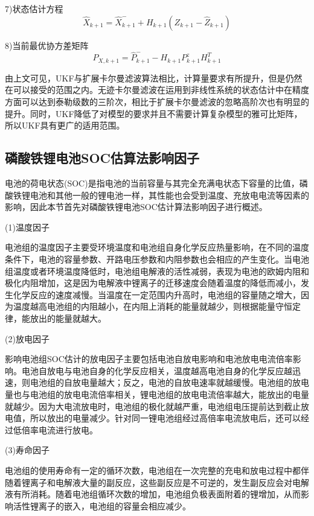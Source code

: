 7)状态估计方程
\begin{equation}
{\widehat X_{k + 1}} = \widehat X_{k + 1}^ -  + {H_{k + 1}}({Z_{k + 1}} - {\widehat Z_{k + 1}})
\end{equation} 

8)当前最优协方差矩阵
\begin{equation}
{P_{X,k + 1}} = \widehat P_{k + 1}^ -  - {H_{k + 1}}P_{k + 1}^zH_{k + 1}^T
\end{equation} 

由上文可见，UKF与扩展卡尔曼滤波算法相比，计算量要求有所提升，但是仍然在可以接受的范围之内。无迹卡尔曼滤波在运用到非线性系统的状态估计中在精度方面可以达到泰勒级数的三阶次，相比于扩展卡尔曼滤波的忽略高阶次也有明显的提升。同时，UKF降低了对模型的要求并且不需要计算复杂模型的雅可比矩阵，所以UKF具有更广的适用范围。


\subsection{磷酸铁锂电池SOC估算法影响因子}
电池的荷电状态(SOC)是指电池的当前容量与其完全充满电状态下容量的比值，磷酸铁锂电池和其他一般的锂电池一样，其性能也会受到温度、充放电电流等因素的影响，因此本节首先对磷酸铁锂电池SOC估计算法影响因子进行概述。

(1)温度因子

	电池组的温度因子主要受环境温度和电池组自身化学反应热量影响，在不同的温度条件下，电池的容量参数、开路电压参数和内阻参数也会相应的产生变化。当电池组温度或者环境温度降低时，电池组电解液的活性减弱，表现为电池的欧姆内阻和极化内阻增加，这是因为电解液中锂离子的迁移速度会随着温度的降低而减小，发生化学反应的速度减慢。当温度在一定范围内升高时，电池组的容量随之增大，因为温度越高电池组的内阻越小，在内阻上消耗的能量就越少，则根据能量守恒定律，能放出的能量就越大。

(2)放电因子

	影响电池组SOC估计的放电因子主要包括电池自放电影响和电池放电电流倍率影响。电池自放电与电池自身的化学反应相关，温度越高电池自身的化学反应越迅速，则电池组的自放电量越大；反之，电池的自放电速率就越缓慢。电池组的放电量也与电池组的放电电流倍率相关，锂电池组的放电电流倍率越大，能放出的电量就越少。因为大电流放电时，电池组的极化就越严重，电池组电压提前达到截止放电值，所以放出的电量减少。针对同一锂电池组经过高倍率电流放电后，还可以经过低倍率电流进行放电。

(3)寿命因子

	电池组的使用寿命有一定的循环次数，电池组在一次完整的充电和放电过程中都伴随着锂离子和电解液大量的副反应，这些副反应是不可逆的，发生副反应会对电解液有所消耗。随着电池组循环次数的增加，电池组负极表面附着的锂增加，从而影响活性锂离子的嵌入，电池组的容量会相应减少。
